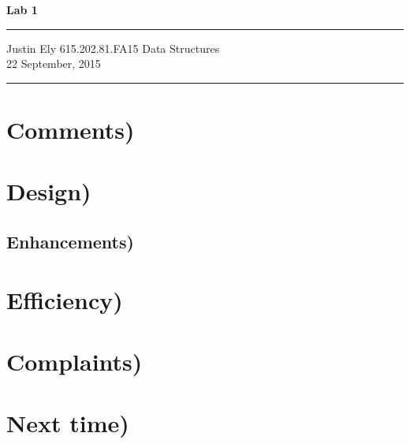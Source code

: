 \documentclass[a4paper,11pt]{article}
\begin{document}
\begin{flushright}

\vspace{1.1cm}

{\bf\Huge Lab 1}

\rule{0.25\linewidth}{0.5pt}

\vspace{0.5cm}
Justin Ely
\linebreak
\newline
\footnotesize{615.202.81.FA15 Data Structures \\}
\vspace{0.5cm}
22 September, 2015
\end{flushright}

\noindent\rule{\linewidth}{1.0pt}


\section*{Comments)}


\section*{Design)}

\subsection*{Enhancements)}


\section*{Efficiency)}


\section*{Complaints)}


\section*{Next time)}

\end{document}

